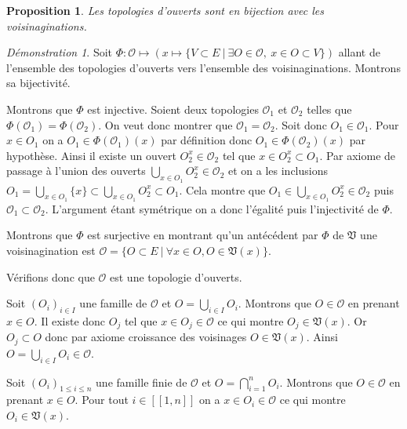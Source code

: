 \documentclass[a4paper, 11pt, french]{book}
\newenvironment{itemise}{\itemize}{\enditemize}
\theoremstyle{plain} %
\newtheorem{proposition}{Proposition}
\theoremstyle{definition} %
\theoremstyle{remark} %
\newtheorem*{demonstration}{Démonstration}
\newcommand{\1}{\mathds{1}}
\newcommand{\infegal}{\leqslant}
\newcommand\ens[2]{\{#1 \ |\ #2\}}
\begin{document}
\begin{proposition}
	Les topologies d'ouverts sont en bijection avec les voisinaginations.
\end{proposition}

\begin{demonstration}
	Soit $\Phi\colon\mathscr{O}\mapsto(x\mapsto\ens{V\subset E}{\exists O\in\mathscr{O},\ x\in O\subset V})$ allant de l'ensemble des topologies d'ouverts vers l'ensemble des voisinaginations.
	Montrons sa bijectivité.
	\begin{itemise}
		\item Montrons que $\Phi$ est injective.
		Soient deux topologies $\mathscr{O}_1$ et $\mathscr{O}_2$ telles que $\Phi(\mathscr{O}_1)=\Phi(\mathscr{O}_2)$.
		On veut donc montrer que $\mathscr{O}_1=\mathscr{O}_2$.
		Soit donc $O_1\in\mathscr{O}_1$.
		Pour $x\in O_1$ on a $O_1\in\Phi(\mathscr{O}_1)(x)$ par définition donc $O_1\in\Phi(\mathscr{O}_2)(x)$ par hypothèse.
		Ainsi il existe un ouvert $O_2^x\in\mathscr{O}_2$ tel que $x\in O_2^x\subset O_1$.
		Par axiome de passage à l'union des ouverts $\bigcup_{x\in O_1}O_2^x\in\mathscr{O}_2$ et on a les inclusions $O_1=\bigcup_{x\in O_1}\{x\}\subset\bigcup_{x\in O_1}O_2^x\subset O_1$.
		Cela montre que $O_1\in\bigcup_{x\in O_1}O_2^x\in\mathscr{O}_2$ puis $\mathscr{O}_1\subset\mathscr{O}_2$.
		L'argument étant symétrique on a donc l'égalité puis l'injectivité de $\Phi$.
		\item Montrons que $\Phi$ est surjective en montrant qu'un antécédent par $\Phi$ de $\mathfrak{V}$ une voisinagination est $\mathscr{O}=\ens{O\subset E}{\forall x\in O, O\in\mathfrak{V}(x)}$.
		\begin{itemise}
			\item Vérifions donc que $\mathscr{O}$ est une topologie d'ouverts.
			\begin{itemise}
				\item Soit $(O_i)_{i\in I}$ une famille de $\mathscr{O}$ et $O=\bigcup_{i\in I}O_i$.
				Montrons que $O\in\mathscr{O}$ en prenant $x\in O$.
				Il existe donc $O_j$ tel que $x\in O_j\in\mathscr{O}$ ce qui montre $O_j\in\mathfrak{V}(x)$.
				Or $O_j\subset O$ donc par axiome croissance des voisinages $O\in\mathfrak{V}(x)$.
				Ainsi $O=\bigcup_{i\in I}O_i\in\mathscr{O}$.
				\item Soit $(O_i)_{1\infegal i\infegal n}$ une famille finie de $\mathscr{O}$ et $O=\bigcap_{i=1}^nO_i$.
				Montrons que $O\in\mathscr{O}$ en prenant $x\in O$.
				Pour tout $i\in[\![1, n]\!]$ on a $x\in O_i\in\mathscr{O}$ ce qui montre $O_i\in\mathfrak{V}(x)$.

\end{itemise}
\end{itemise}
\end{itemise}
\end{demonstration}
\end{document}
